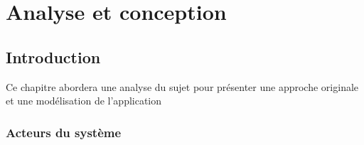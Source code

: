 \chapter{Analyse et conception}



\section{Introduction}

Ce chapitre abordera une analyse du sujet pour présenter une approche originale et une modélisation de l’application


\subsection{Acteurs du système}
 

